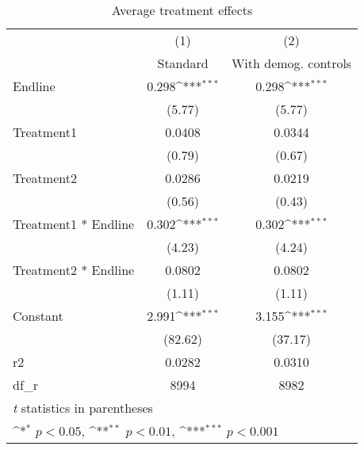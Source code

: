 \begin{table}[htbp]\centering
\def\sym#1{\ifmmode^{#1}\else\(^{#1}\)\fi}
\caption{Average treatment effects}
\begin{tabular}{l*{2}{c}}
\hline\hline
                    &\multicolumn{1}{c}{(1)}&\multicolumn{1}{c}{(2)}\\
                    &\multicolumn{1}{c}{Standard}&\multicolumn{1}{c}{With demog. controls}\\
\hline
Endline             &       0.298\sym{***}&       0.298\sym{***}\\
                    &      (5.77)         &      (5.77)         \\
[1em]
Treatment1          &      0.0408         &      0.0344         \\
                    &      (0.79)         &      (0.67)         \\
[1em]
Treatment2          &      0.0286         &      0.0219         \\
                    &      (0.56)         &      (0.43)         \\
[1em]
Treatment1 * Endline&       0.302\sym{***}&       0.302\sym{***}\\
                    &      (4.23)         &      (4.24)         \\
[1em]
Treatment2 * Endline&      0.0802         &      0.0802         \\
                    &      (1.11)         &      (1.11)         \\
[1em]
Constant            &       2.991\sym{***}&       3.155\sym{***}\\
                    &     (82.62)         &     (37.17)         \\
\hline
r2                  &      0.0282         &      0.0310         \\
df\_r                &        8994         &        8982         \\
\hline\hline
\multicolumn{3}{l}{\footnotesize \textit{t} statistics in parentheses}\\
\multicolumn{3}{l}{\footnotesize \sym{*} \(p<0.05\), \sym{**} \(p<0.01\), \sym{***} \(p<0.001\)}\\
\end{tabular}
\end{table}
